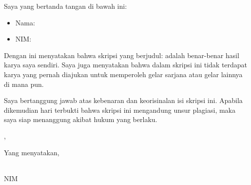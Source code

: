 

\noindent Saya yang bertanda tangan di bawah ini:
\begin{itemize}[label={}, nosep]
    \item Nama: \authorName
    \item NIM: \studentID
\end{itemize}

\noindent Dengan ini menyatakan bahwa skripsi yang berjudul: \textit{\titleLine}
\noindent adalah benar-benar hasil karya saya sendiri. Saya juga menyatakan bahwa dalam skripsi ini tidak terdapat karya yang pernah diajukan untuk memperoleh gelar sarjana atau gelar lainnya di mana pun.

\noindent Saya bertanggung jawab atas kebenaran dan keorisinalan isi skripsi ini. Apabila dikemudian hari terbukti bahwa skripsi ini mengandung unsur plagiasi, maka saya siap menanggung akibat hukum yang berlaku.

\vspace{1.5cm}
\begin{flushright}
\city{}, \examinationDate{}

Yang menyatakan,
\end{flushright}


\vspace{1.5cm} %

\begin{flushright}
\authorName{} \\
NIM \studentID{}
\end{flushright}

\newpage

